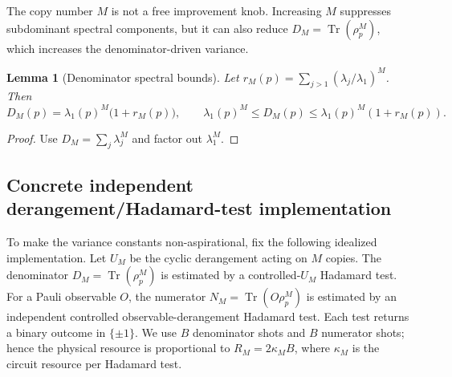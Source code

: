 \documentclass[11pt]{article}
\newtheorem{lemma}{Lemma}
\DeclareMathOperator{\Tr}{Tr}
\newcommand{\1}{\mathbf{1}}
\begin{document}
The copy number \(M\) is not a free improvement knob.  Increasing \(M\) suppresses subdominant spectral components, but it can also reduce \(D_M=\Tr(\rho_p^M)\), which increases the denominator-driven variance.

\begin{lemma}[Denominator spectral bounds]
\label{lem:denom_spectral_bounds_v4}
Let \(r_M(p)=\sum_{j>1}(\lambda_j/\lambda_1)^M\).  Then
\begin{equation}
    D_M(p)=\lambda_1(p)^M\bigl(1+r_M(p)\bigr),
    \qquad
    \lambda_1(p)^M\leq D_M(p)\leq \lambda_1(p)^M(1+r_M(p)).
    \label{eq:dm_spectral_bounds_v4}
\end{equation}
\end{lemma}

\begin{proof}
Use \(D_M=\sum_j\lambda_j^M\) and factor out \(\lambda_1^M\).
\end{proof}

\subsection{Concrete independent derangement/Hadamard-test implementation}

To make the variance constants non-aspirational, fix the following idealized implementation.  Let \(U_M\) be the cyclic derangement acting on \(M\) copies.  The denominator \(D_M=\Tr(\rho_p^M)\) is estimated by a controlled-\(U_M\) Hadamard test.  For a Pauli observable \(O\), the numerator \(N_M=\Tr(O\rho_p^M)\) is estimated by an independent controlled observable-derangement Hadamard test.  Each test returns a binary outcome in \(\{\pm1\}\).  We use \(B\) denominator shots and \(B\) numerator shots; hence the physical resource is proportional to \(R_M=2\kappa_M B\), where \(\kappa_M\) is the circuit resource per Hadamard test.
\end{document}
